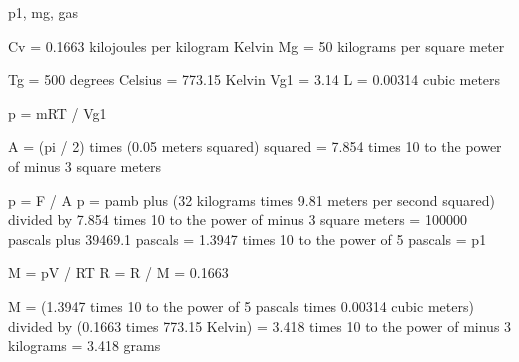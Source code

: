 p1, mg, gas

Cv = 0.1663 kilojoules per kilogram Kelvin
Mg = 50 kilograms per square meter

Tg = 500 degrees Celsius = 773.15 Kelvin
Vg1 = 3.14 L = 0.00314 cubic meters

p = mRT / Vg1

A = (pi / 2) times (0.05 meters squared) squared = 7.854 times 10 to the power of minus 3 square meters

p = F / A
p = pamb plus (32 kilograms times 9.81 meters per second squared) divided by 7.854 times 10 to the power of minus 3 square meters
= 100000 pascals plus 39469.1 pascals = 1.3947 times 10 to the power of 5 pascals = p1

M = pV / RT
R = R / M = 0.1663

M = (1.3947 times 10 to the power of 5 pascals times 0.00314 cubic meters) divided by (0.1663 times 773.15 Kelvin) = 3.418 times 10 to the power of minus 3 kilograms
= 3.418 grams
